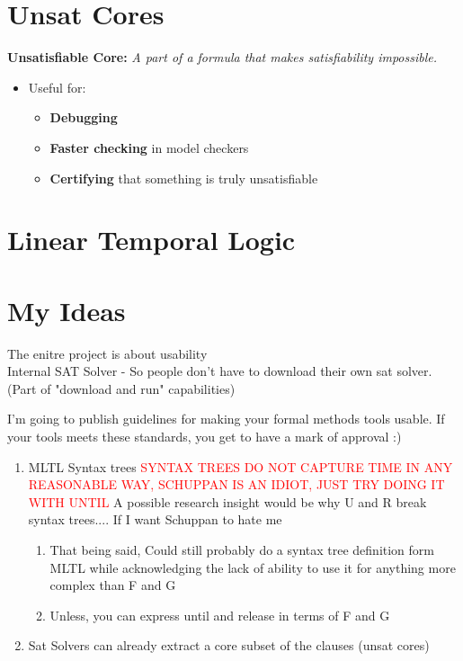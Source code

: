 \documentclass{article}
\begin{document}
\section*{Unsat Cores}
\textbf{Unsatisfiable Core:}
    \emph{A part of a formula that makes satisfiability impossible.}
\begin{itemize}
    \item Useful for:
    \begin{itemize}
        \item \textbf{Debugging}
        \item \textbf{Faster checking} in model checkers
        \item \textbf{Certifying} that something is truly unsatisfiable
    \end{itemize}
\end{itemize}






\section*{Linear Temporal Logic}


\section*{My Ideas}

The enitre project is about usability\\
Internal SAT Solver - So people don't have to download their own sat solver.
(Part of "download and run" capabilities)

I'm going to publish guidelines for making your formal methods tools usable.
If your tools meets these standards, you get to have a mark of approval :)



\begin{enumerate}
    \item MLTL Syntax trees \textcolor{red}{SYNTAX TREES DO NOT CAPTURE TIME IN ANY REASONABLE WAY, SCHUPPAN IS AN IDIOT, JUST TRY DOING IT WITH UNTIL} A possible research insight would be why U and R break syntax trees.... If I want Schuppan to hate me
    \begin{enumerate}
        \item That being said, Could still probably do a syntax tree definition form MLTL while acknowledging the lack of ability to use it for anything more complex than F and G
        \item Unless, you can express until and release in terms of F and G
    \end{enumerate}
    \item Sat Solvers can already extract a core subset of the clauses (unsat cores)
\end{enumerate}
\end{document}
